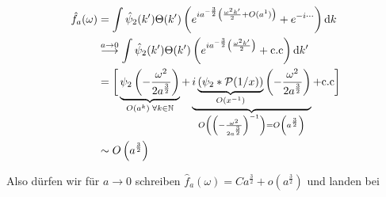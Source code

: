 \begin{align*}
    \hat f_a(\omega)
    &=
    \int \hat\psi_2(k')\Theta(k')
    \left(
        e^{i a^{-\frac{3}{2}}\left(\frac{\omega^2 k'}{2} + O(a^1)\right)}
        + e^{-i \cdots}
    \right) \mathop{}\!\mathrm{d} k
    \\ &\stackrel{a \to 0}{\longrightarrow}
    \int \hat\psi_2(k')\Theta(k')
    \left(
        e^{i a^{-\frac{3}{2}}\left(\frac{\omega^2 k'}{2}\right)}
        + \mathrm{c.c}
    \right) \mathop{}\!\mathrm{d} k'
    \\ &=
    \bigg[
        \underbrace{
            \psi_2\left(-\frac{\omega^2}{2 a^{\frac{3}{2}}}\right)
        }_{O(a^k) \; \forall k \in \mathbb{N}}
        + \underbrace{i
            \underbrace{\left(\psi_2 * \mathcal{P}(1/x)\right)}_{O(x^{-1})}
            \left(-\frac{\omega^2}{2 a^{\frac{3}{2}}}\right)
        }_{
            O\left(\left(-\frac{\omega^2}{2 a^{\frac{3}{2}}}\right)^{-1}\right)
            = O\left(a^{\frac{3}{2}}\right)
           }
     + \mathrm{c.c}
     \bigg]
     \\ &\sim
    O\left(a^{\frac{3}{2}}\right)
\end{align*}

Also dürfen wir für $a \to 0$ schreiben $\hat f_a(\omega) = C a^{\frac{3}{2}} + o\left(a^{\frac{3}{2}}\right)$ und landen bei


